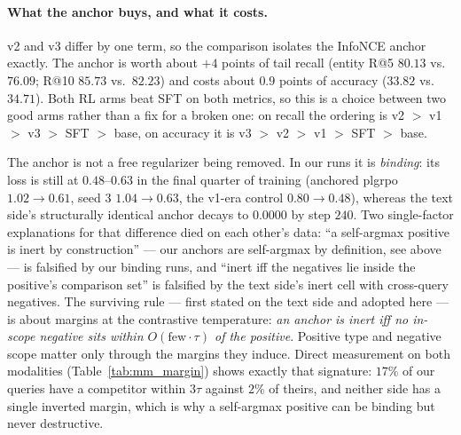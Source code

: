 \paragraph{What the anchor buys, and what it costs.} v2 and v3 differ by one term, so the
comparison isolates the InfoNCE anchor exactly. The anchor is worth about $+4$ points of tail
recall (entity R@5 $80.13$ vs.\ $76.09$; R@10 $85.73$ vs.\ $82.23$) and costs about $0.9$ points
of accuracy ($33.82$ vs.\ $34.71$). Both RL arms beat SFT on both metrics, so this is a choice
between two good arms rather than a fix for a broken one: on recall the ordering is
v2 $>$ v1 $>$ v3 $>$ SFT $>$ base, on accuracy it is v3 $>$ v2 $>$ v1 $>$ SFT $>$ base.

The anchor is not a free regularizer being removed. In our runs it is \emph{binding}: its loss is
still at $0.48$--$0.63$ in the final quarter of training (anchored plgrpo $1.02 \to 0.61$, seed 3
$1.04 \to 0.63$, the v1-era control $0.80 \to 0.48$), whereas the text side's structurally
identical anchor decays to $0.0000$ by step $240$. Two single-factor explanations for that
difference died on each other's data: ``a self-argmax positive is inert by construction'' --- our
anchors are self-argmax by definition, see above --- is falsified by our binding runs, and ``inert iff the negatives lie inside the
positive's comparison set'' is falsified by the text side's inert cell with cross-query
negatives. The surviving rule --- first stated on the text side and adopted here --- is about
margins at the contrastive temperature: \emph{an anchor is inert iff no in-scope negative sits
within $O(\text{few}\cdot\tau)$ of the positive}. Positive type and negative scope matter only
through the margins they induce. Direct measurement on both modalities
(Table~\ref{tab:mm_margin}) shows exactly that signature: $17\%$ of our queries have a
competitor within $3\tau$ against $2\%$ of theirs, and neither side has a single inverted margin,
which is why a self-argmax positive can be binding but never destructive.

